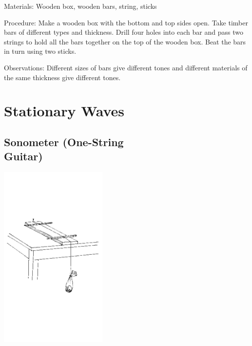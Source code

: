 \begin{multicols}{2}
\begin{description*}
\item[Materials:]{Wooden box, wooden bars, string, sticks}
\item[Procedure:]{Make a wooden box with the bottom and top sides open. Take timber bars of different types and thickness. Drill four holes into each bar and pass two strings to hold all the bars together on the top of the wooden box. Beat the bars in turn using two sticks.}
\item[Observations:]{Different sizes of bars give different tones and different materials of the same thickness give different tones.}
\end{description*}


\section*{Stationary Waves} 


\subsection[Sonometer (One-String Guitar)]{Sonometer (One-String \hfill \\ Guitar)}  

\begin{center}
\includegraphics[width=0.4\textwidth]{./img/source/sonometer.png}
\end{center}


\end{multicols}
